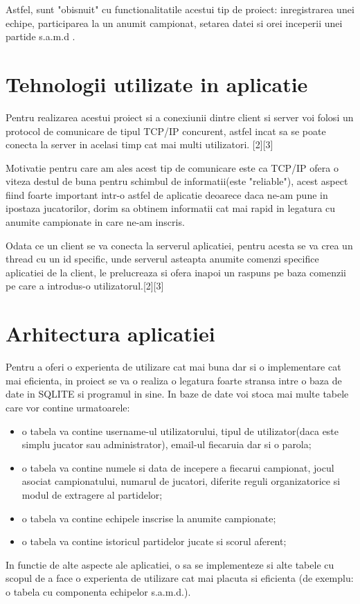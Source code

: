 \documentclass{article}
\begin{document}
Astfel, sunt "obisnuit" cu functionalitatile acestui tip de proiect: inregistrarea unei echipe, participarea la un anumit campionat, setarea datei si orei inceperii unei partide s.a.m.d .

\section{Tehnologii utilizate in aplicatie}
\quad Pentru realizarea acestui proiect si a conexiunii dintre client si server voi folosi un protocol de comunicare  de tipul TCP/IP concurent, astfel incat sa se poate conecta la server in acelasi timp cat mai multi utilizatori.
[2][3]

Motivatie pentru care am ales acest tip de comunicare este ca TCP/IP ofera o viteza destul de buna pentru schimbul de informatii(este "reliable"), acest aspect fiind foarte important intr-o astfel de aplicatie deoarece daca ne-am pune in ipostaza jucatorilor, dorim sa obtinem informatii cat mai rapid in legatura cu anumite campionate in care ne-am inscris.

Odata ce un client se va conecta la serverul aplicatiei, pentru acesta se va crea un thread cu un id specific, unde serverul asteapta anumite comenzi specifice aplicatiei de la client, le prelucreaza si ofera inapoi un raspuns pe baza comenzii pe care a introdus-o utilizatorul.[2][3]
\section{Arhitectura aplicatiei}
\quad Pentru a oferi o experienta de utilizare cat mai buna dar si o implementare cat mai eficienta, in proiect se va o realiza o legatura foarte stransa intre o baza de date in SQLITE si programul in sine. In baze de date voi stoca mai multe tabele care vor contine urmatoarele: 

\begin{itemize}
    \item o tabela va contine username-ul utilizatorului, tipul de utilizator(daca este simplu jucator sau administrator), email-ul fiecaruia dar si o parola;
    \item o tabela va contine numele si data de incepere a fiecarui campionat, jocul asociat campionatului, numarul de jucatori, diferite reguli organizatorice si modul de extragere al partidelor;
    \item o tabela va contine echipele inscrise la anumite campionate;
    \item o tabela va contine istoricul partidelor jucate si scorul aferent;
\end{itemize}
\quad In functie de alte aspecte ale aplicatiei, o sa se implementeze si alte tabele cu scopul de a face o experienta de utilizare cat mai placuta si eficienta (de exemplu: o tabela cu componenta echipelor s.a.m.d.).
\end{document}
